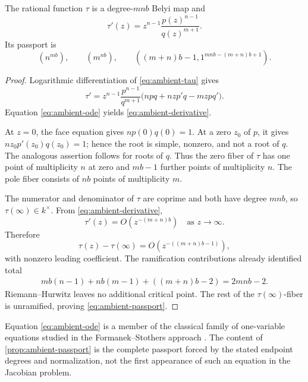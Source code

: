 \documentclass[11pt,reqno]{amsart}
\begin{document}
\begin{proposition}
\label{prop:ambient-passport}
The rational function \(\tau\) is a degree-\(mnb\) Belyi map and
\begin{equation}
\label{eq:ambient-derivative}
\tau'(z)=z^{n-1}\frac{p(z)^{n-1}}{q(z)^{m+1}}.
\end{equation}
Its passport is
\begin{equation}
\label{eq:ambient-passport}
\left(n^{mb}\right),\qquad
\left(m^{nb}\right),\qquad
\left((m+n)b-1,1^{mnb-(m+n)b+1}\right).
\end{equation}
\end{proposition}

\begin{proof}
Logarithmic differentiation of \eqref{eq:ambient-tau} gives
\[
\tau'
=z^{n-1}\frac{p^{n-1}}{q^{m+1}}
\bigl(npq+nzp'q-mzpq'\bigr).
\]
Equation \eqref{eq:ambient-ode} yields
\eqref{eq:ambient-derivative}.

At \(z=0\), the face equation gives \(np(0)q(0)=1\).  At a zero
\(z_0\) of \(p\), it gives \(nz_0p'(z_0)q(z_0)=1\); hence the root is
simple, nonzero, and not a root of \(q\).  The analogous assertion follows
for roots of \(q\).  Thus the zero fiber of \(\tau\) has one point of
multiplicity \(n\) at zero and \(mb-1\) further points of multiplicity
\(n\).  The pole fiber consists of \(nb\) points of multiplicity \(m\).

The numerator and denominator of \(\tau\) are coprime and both have degree
\(mnb\), so \(\tau(\infty)\in k^\times\).  From
\eqref{eq:ambient-derivative},
\[
\tau'(z)=O\!\left(z^{-(m+n)b}\right)
\quad\text{as }z\longrightarrow\infty.
\]
Therefore
\[
\tau(z)-\tau(\infty)
=O\!\left(z^{-((m+n)b-1)}\right),
\]
with nonzero leading coefficient.  The ramification contributions already
identified total
\begin{align*}
mb(n-1)+nb(m-1)+((m+n)b-2)
=2mnb-2.
\end{align*}
Riemann--Hurwitz leaves no additional critical point.  The rest of the
\(\tau(\infty)\)-fiber is unramified, proving
\eqref{eq:ambient-passport}.
\end{proof}

\begin{remark}
Equation \eqref{eq:ambient-ode} is a member of the classical family of
one-variable equations studied in the Formanek--Stothers approach
\cite{formanek2011stothers}.  The content of
\cref{prop:ambient-passport} is the complete passport forced by the stated
endpoint degrees and normalization, not the first appearance of such an
equation in the Jacobian problem.
\end{remark}
\end{document}

